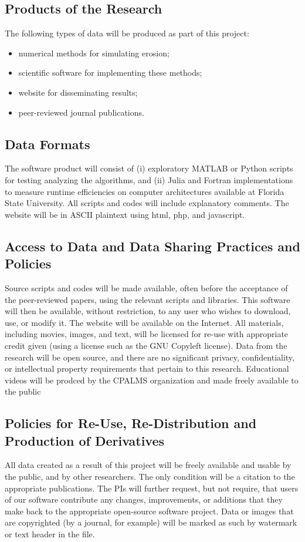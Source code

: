 \documentclass[11pt]{article}
\begin{document}
\thispagestyle{fancy}
\subsection*{Products of the Research}
The following types of data will be produced as part of this project:
\begin{itemize}[noitemsep,topsep=0pt,parsep=0pt,partopsep=0pt] 
\item numerical methods for simulating erosion;
\item scientific software for implementing these methods;
\item website for disseminating results;
\item peer-reviewed journal publications.
\end{itemize}

\subsection*{Data Formats}
The software product will consist of (i) exploratory MATLAB or Python
scripts for testing analyzing the algorithms, and (ii) Julia and Fortran
implementations to measure runtime efficiencies on computer
architectures available at Florida State University.  All scripts and
codes will include explanatory comments.  The website will be in ASCII
plaintext using html, php, and javascript.


\subsection*{Access to Data and Data Sharing Practices and Policies}
Source scripts and codes will be made available, often before the
acceptance of the peer-reviewed papers, using the relevant scripts and
libraries.  This software will then be available, without restriction,
to any user who wishes to download, use, or modify it.  The website will
be available on the Internet.  All materials, including movies, images,
and text, will be licensed for re-use with appropriate credit given
(using a license such as the GNU Copyleft license).  Data from the
research will be open source, and there are no significant privacy,
confidentiality, or intellectual property requirements that pertain to
this research. Educational videos will be prodced by the CPALMS
organization and made freely available to the public


\subsection*{Policies for Re-Use, Re-Distribution and Production of
Derivatives}
All data created as a result of this project will be freely available
and usable by the public, and by other researchers.  The only condition
will be a citation to the appropriate publications.  The PIs will
further request, but not require, that users of our software contribute
any changes, improvements, or additions that they make back to the
appropriate open-source software project.  Data or images that are
copyrighted (by a journal, for example) will be marked as such by
watermark or text header in the file.
\end{document}
